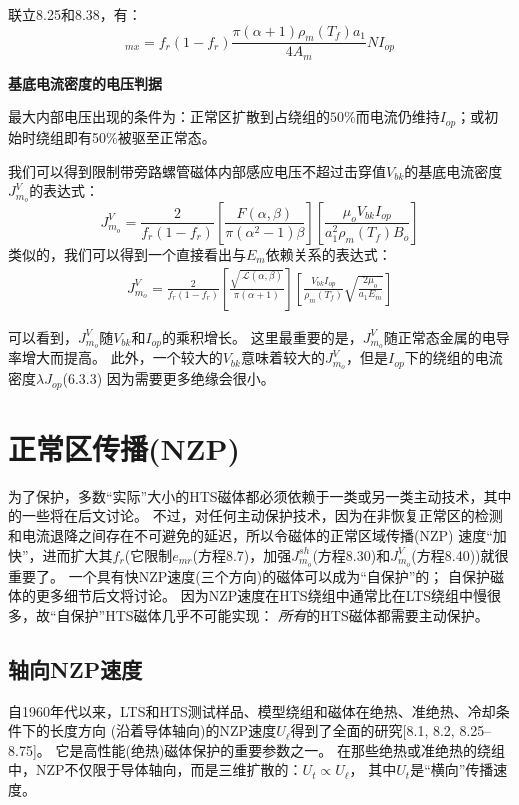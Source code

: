 联立8.25和8.38，有：
\begin{equation}%
[V_{in}]_{mx}=f_r(1-f_r)\frac{\pi(\alpha+1)\rho_m(T_f)a_1}{4A_m}NI_{op}
\end{equation}

\textbf{基底电流密度的电压判据}

最大内部电压出现的条件为：正常区扩散到占绕组的$50\%$而电流仍维持$I_{op}$；或初始时绕组即有50\%被驱至正常态。

我们可以得到限制带旁路螺管磁体内部感应电压不超过击穿值$V_{bk}$的基底电流密度$J_{m_o}^V$的表达式：
\begin{equation}%
J_{m_o}^{V}=\frac{2}{f_r(1-f_r)}\left[\frac{F(\alpha,\beta)}{\pi(\alpha^2-1)\beta}\right]\left[\frac{\mu_oV_{bk}I_{op}}{a_{1}^{2}\rho_m(T_f)B_o}\right]
\end{equation}
类似的，我们可以得到一个直接看出与$E_m$依赖关系的表达式：
\begin{align*}%
J_{m_o}^{V}=\frac{2}{f_r(1-f_r)}\left[\frac{\sqrt{\ \mathcal{L}(\alpha,\beta)}}{\pi(\alpha+1)}\right]\left[\frac{V_{bk}I_{op}}{\rho_m(T_f)}\sqrt{\frac{2\mu_o}{a_1E_m}}\right] \tag{8.40b}
\end{align*}

可以看到，$J_{m_o}^V$随$V_{bk}$和$I_{op}$的乘积增长。
这里最重要的是，$J_{m_o}^V$随正常态金属的电导率增大而提高。
此外，一个较大的$V_{bk}$意味着较大的$J_{m_o}^V$，但是$I_{op}$下的绕组的电流密度$\lambda J_{op}$(6.3.3)
因为需要更多绝缘会很小。

\section{正常区传播(NZP)}
为了保护，多数“实际”大小的HTS磁体都必须依赖于一类或另一类主动技术，其中的一些将在后文讨论。
不过，对任何主动保护技术，因为在非恢复正常区的检测和电流退降之间存在不可避免的延迟，所以令磁体的正常区域传播(NZP)
速度“加快”，进而扩大其$f_r$(它限制$e_{mr}$(方程8.7)，加强$J_{m_o}^{sh}$(方程8.30)和$J_{m_o}^V$(方程8.40))就很重要了。
一个具有快NZP速度(三个方向)的磁体可以成为“自保护”的；
自保护磁体的更多细节后文将讨论。
因为NZP速度在HTS绕组中通常比在LTS绕组中慢很多，故“自保护”HTS磁体几乎不可能实现：
\textit{所有}的HTS磁体都需要主动保护。

\subsection{轴向NZP速度}
自1960年代以来，LTS和HTS测试样品、模型绕组和磁体在绝热、准绝热、冷却条件下的长度方向
(沿着导体轴向)的NZP速度$U_\ell$得到了全面的研究[8.1, 8.2, 8.25–8.75]。
它是高性能(绝热)磁体保护的重要参数之一。
在那些绝热或准绝热的绕组中，NZP不仅限于导体轴向，而是三维扩散的：$U_t\propto U_\ell$，
其中$U_t$是“横向”传播速度。

